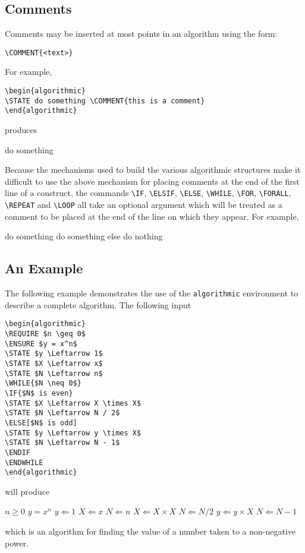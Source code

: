 \documentclass{article}
\newcommand{\keyword}[1]{\texttt{#1}}
\begin{document}
\subsection{Comments}

Comments may be inserted at most points in an algorithm using the form:
\begin{verbatim}
\COMMENT{<text>}
\end{verbatim}
For example,
\begin{verbatim}
\begin{algorithmic}
\STATE do something \COMMENT{this is a comment}
\end{algorithmic}
\end{verbatim}
produces
\begin{algorithmic}
  \STATE do something 
\end{algorithmic}
Because the mechanisms used to build the various algorithmic structures
make it difficult to use the above mechanism for placing comments at the
end of the first line of a construct, the commands \verb+\IF+,
\verb+\ELSIF+, \verb+\ELSE+, \verb+\WHILE+, \verb+\FOR+,
\verb+\FORALL+, \verb+\REPEAT+
and \verb+\LOOP+ all take an optional argument which will be treated
as a comment to be placed at the end of the line on which they appear.
For example,
\begin{algorithmic}
  \STATE do something
  \STATE do something else
  \STATE do nothing
  \ENDIF
\end{algorithmic}

\subsection{An Example}

The following example demonstrates the use of the \keyword{algorithmic}
environment to describe a complete algorithm.  The following input
\begin{verbatim}
\begin{algorithmic}
\REQUIRE $n \geq 0$
\ENSURE $y = x^n$
\STATE $y \Leftarrow 1$
\STATE $X \Leftarrow x$
\STATE $N \Leftarrow n$
\WHILE{$N \neq 0$}
\IF{$N$ is even}
\STATE $X \Leftarrow X \times X$
\STATE $N \Leftarrow N / 2$
\ELSE[$N$ is odd]
\STATE $y \Leftarrow y \times X$
\STATE $N \Leftarrow N - 1$
\ENDIF
\ENDWHILE
\end{algorithmic}
\end{verbatim}
will produce
\begin{algorithmic}
  \REQUIRE $n \geq 0$
  \ENSURE $y = x^n$
  \STATE $y \Leftarrow 1$
  \STATE $X \Leftarrow x$
  \STATE $N \Leftarrow n$
  \STATE $X \Leftarrow X \times X$
  \STATE $N \Leftarrow N / 2$
  \ELSE[$N$ is odd]
  \STATE $y \Leftarrow y \times X$
  \STATE $N \Leftarrow N - 1$
  \ENDIF
  \ENDWHILE
\end{algorithmic}
which is an algorithm for finding the value of a number taken to a
non-negative power.
\end{document}
